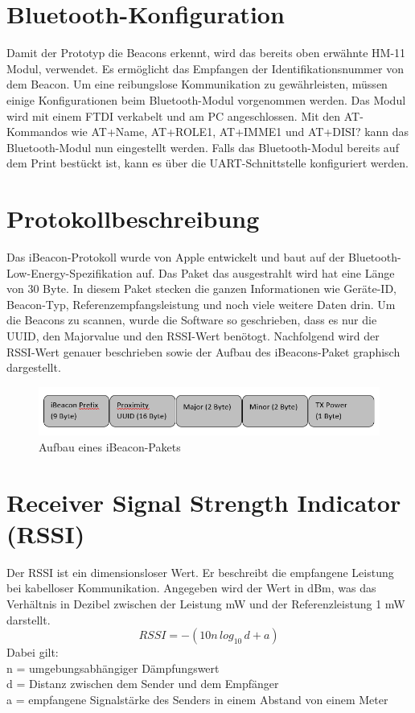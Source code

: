 \section{Bluetooth-Konfiguration}
Damit der Prototyp die Beacons erkennt, wird das bereits oben erwähnte HM-11 Modul, verwendet. Es ermöglicht das Empfangen der Identifikationsnummer von dem Beacon. Um eine reibungslose Kommunikation zu gewährleisten, müssen einige Konfigurationen beim Bluetooth-Modul vorgenommen werden. Das Modul wird mit einem FTDI verkabelt und am PC angeschlossen. Mit den AT-Kommandos wie AT+Name, AT+ROLE1, AT+IMME1 und AT+DISI? kann das Bluetooth-Modul nun eingestellt werden. Falls das Bluetooth-Modul bereits auf dem Print bestückt ist, kann es über die UART-Schnittstelle konfiguriert werden. 

\section{Protokollbeschreibung}
Das iBeacon-Protokoll wurde von Apple entwickelt und baut auf der Bluetooth-Low-Energy-Spezifikation auf. Das Paket das ausgestrahlt wird hat eine Länge von 30 Byte. In diesem Paket stecken die ganzen Informationen wie Geräte-ID, Beacon-Typ, Referenzempfangsleistung und noch viele weitere Daten drin. Um die Beacons zu scannen, wurde die Software so geschrieben, dass es nur die UUID, den Majorvalue und den RSSI-Wert benötogt. Nachfolgend wird der RSSI-Wert genauer beschrieben sowie der Aufbau des iBeacons-Paket graphisch dargestellt. 

\begin{figure}[htp]
\centering
\includegraphics[width=15cm]{Bilder/iBeacon_Paket.PNG}
\caption{Aufbau eines iBeacon-Pakets}
\label{fig:iBeacon}
\end{figure}

\section{Receiver Signal Strength Indicator (RSSI)}
Der RSSI ist ein dimensionsloser Wert. Er beschreibt die empfangene Leistung bei kabelloser Kommunikation. Angegeben wird der Wert in dBm, was das Verhältnis in Dezibel zwischen der Leistung mW und der Referenzleistung 1 mW darstellt.
\begin{equation}
    RSSI = -(10n\,log_{10}\,d+a)
\end{equation}
Dabei gilt: \\
\hspace*{10mm}
n = umgebungsabhängiger Dämpfungswert \\
\hspace*{10mm}
d = Distanz zwischen dem Sender und dem Empfänger \\
\hspace*{10mm}
a = empfangene Signalstärke des Senders in einem Abstand von einem Meter \\
\newpage
